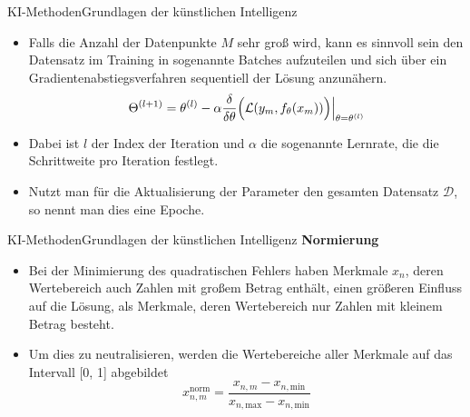 \documentclass[169, handout	]{THIbeamer} %
\begin{document}
	\begin{frame}{KI-Methoden}{Grundlagen der künstlichen Intelligenz}
	\begin{itemize}
		\item Falls die Anzahl der Datenpunkte $M$ sehr groß wird, kann es sinnvoll sein den Datensatz im Training in sogenannte Batches aufzuteilen und sich über ein Gradientenabstiegsverfahren sequentiell der Lösung anzunähern.
		\begin{equation}
			\Theta ^{(l+1)} = \theta ^{(l)} - \alpha \frac{\delta}{\delta \theta} \Bigl(\mathcal{L} (y_m, f_{\theta} (x_m))\Bigr) \Big| _{\theta = \theta^{(l)}}
		\end{equation}
		\item[] Dabei ist $l$ der Index der Iteration und $\alpha$ die sogenannte Lernrate, die die Schrittweite pro Iteration festlegt.
		\item Nutzt man für die Aktualisierung der Parameter den gesamten Datensatz $\mathcal{D}$, so nennt man dies eine Epoche.
	\end{itemize}
\end{frame}
	\begin{frame}{KI-Methoden}{Grundlagen der künstlichen Intelligenz}
	\textbf{Normierung}
	\begin{itemize}
		\item Bei der Minimierung des quadratischen Fehlers haben Merkmale $x_n$, deren Wertebereich auch Zahlen mit großem Betrag enthält, einen größeren Einfluss auf die Lösung, als Merkmale, deren Wertebereich nur Zahlen mit kleinem Betrag besteht.
		\item Um dies zu neutralisieren, werden die Wertebereiche aller Merkmale auf das Intervall [0, 1] abgebildet
		\begin{equation}
			x_{n,m}^{\text{norm}} = \frac{x_{n,m} - x_{n,\text{min}}}{x_{n,\text{max}} - x_{n,\text{min}}}
		\end{equation}
	\end{itemize}
\end{frame}
\end{document}
